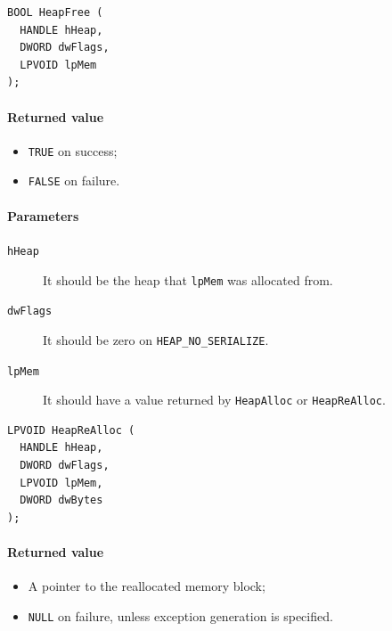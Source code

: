 \begin{verbatim}
BOOL HeapFree (
  HANDLE hHeap,
  DWORD dwFlags,
  LPVOID lpMem
);
\end{verbatim}

\paragraph{Returned value}
\begin{itemize}
\item \texttt{TRUE} on success;
\item \texttt{FALSE} on failure.
\end{itemize}

\paragraph{Parameters}
\begin{description}
\item [\texttt{hHeap}] It should be the heap that \texttt{lpMem} was allocated from.
\item [\texttt{dwFlags}] It should be zero on \texttt{HEAP\_NO\_SERIALIZE}.
\item [\texttt{lpMem}] It should have a value returned by \texttt{HeapAlloc} or \texttt{HeapReAlloc}.
\end{description}

\begin{verbatim}
LPVOID HeapReAlloc (
  HANDLE hHeap,
  DWORD dwFlags,
  LPVOID lpMem,
  DWORD dwBytes
);
\end{verbatim}

\paragraph{Returned value}
\begin{itemize}
\item A pointer to the reallocated memory block;
\item \texttt{NULL} on failure, unless exception generation is specified.
\end{itemize}

